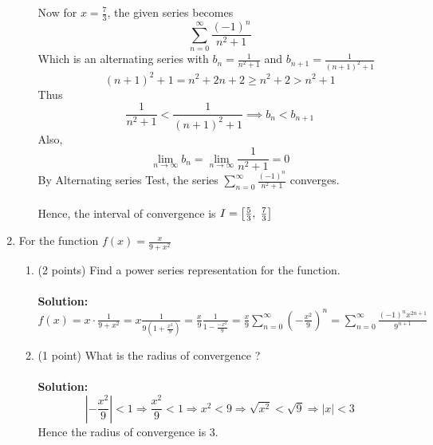 \documentclass[paper=a4, fontsize=11pt]{scrartcl} %
\newcommand{\ds}{\displaystyle}
\numberwithin{equation}{section} %
\numberwithin{figure}{section} %
\numberwithin{table}{section} %
\begin{document}
\begin{enumerate}
\begin{enumerate}
Now for $x=\frac{7}{3}$, the given series becomes
$$\sum_{n=0}^{\infty}\frac{(-1)^n}{n^2+1}$$
Which is an alternating series with $b_n=\frac{1}{n^2+1}$ and $b_{n+1}=\frac{1}{(n+1)^2+1}$
$$(n+1)^2+1=n^2+2n+2\ge n^2+2>n^2+1$$
Thus $$\frac{1}{n^2+1}<\frac{1}{(n+1)^2+1}\implies b_n<b_{n+1}$$
Also, $$\lim\limits_{n\rightarrow\infty}b_n=\lim\limits_{n\rightarrow\infty}\frac{1}{n^2+1}=0$$
By Alternating series Test, the series $\ds\sum_{n=0}^{\infty}\frac{(-1)^n}{n^2+1}$ converges.\\\\
Hence, the interval of convergence is $I=\left[\frac{5}{3},\hspace{1mm}\frac{7}{3}\right]$
\end{enumerate}
\item For the function $f(x)=\frac{x}{9+x^2}$
\begin{enumerate}
\item (2 points) Find a power series representation for the function.\\\\
\textbf{Solution:}\hspace{2mm}$f(x)=x\cdot\frac{1}{9+x^2}=x\frac{1}{9(1+\frac{x^2}{9})}=\frac{x}{9}\frac{1}{1-\frac{-x^2}{9}}=\frac{x}{9}\ds\sum_{n=0}^{\infty}\left(-\frac{x^2}{9}\right)^n=\ds\sum_{n=0}^{\infty}\frac{(-1)^nx^{2n+1}}{9^{n+1}}$

\item (1 point) What is the radius of convergence ?\\\\
\textbf{Solution: } $$\left|-\frac{x^2}{9}\right|<1\Rightarrow \frac{x^2}{9}<1\Rightarrow x^2<9\Rightarrow\sqrt{x^2}<\sqrt{9}\Rightarrow |x|<3$$
Hence the radius of convergence is 3.

\end{enumerate}
\end{enumerate}

\end{document}
